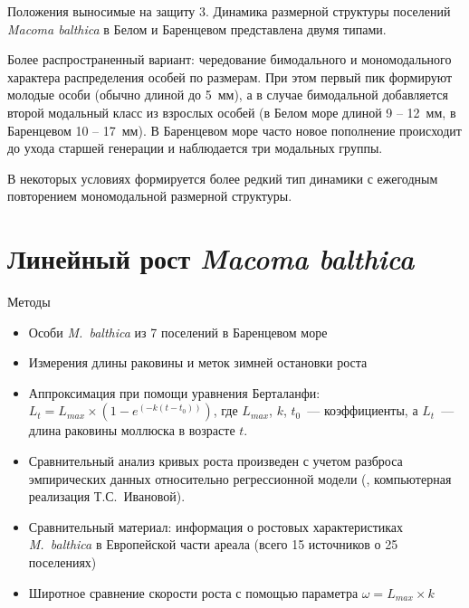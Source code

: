 \documentclass{beamer}
\begin{document}
\begin{frame}{Положения выносимые на защиту}
3. Динамика размерной структуры поселений {\it Macoma balthica} в Белом и Баренцевом представлена двумя типами. 

\smallskip
Более распространенный вариант: чередование бимодального и мономодального характера распределения особей по размерам. 
При этом первый пик формируют молодые особи (обычно длиной до 5~мм), а в случае бимодальной добавляется второй модальный класс из взрослых особей (в Белом море длиной 9 -- 12~мм, в Баренцевом 10 -- 17~мм). 
В Баренцевом море часто новое пополнение происходит до ухода старшей генерации и наблюдается три модальных группы.

\smallskip
В некоторых условиях формируется более редкий тип динамики с ежегодным повторением мономодальной размерной структуры. 
\end{frame}


		\section[Линейный рост]{Линейный рост {\it Macoma balthica}}
\begin{frame}{Методы}
	\begin{itemize}
		\item Особи {\it M.~balthica} из 7 поселений в Баренцевом море
		\item Измерения длины раковины и меток зимней остановки роста
		\item Аппроксимация при помощи уравнения Берталанфи: $L_{t} = L_{max} \times (1 - e^{(-k(t - t_{0}))})$, где $L_{max}$, $k$, $t_{0}$~--- коэффициенты, а $L_{t}$~--- длина раковины моллюска в возрасте $t$.
		\item Сравнительный анализ кривых роста произведен с учетом разброса эмпирических данных относительно регрессионной модели (\cite{Maximovich_1989}, компьютерная реализация Т.\:С.~Ивановой). 
		\item  Сравнительный материал: информация о ростовых характеристиках {\it M.~balthica} в Европейской части ареала (всего 15 источников о 25 поселениях)
		\item Широтное сравнение скорости роста с помощью параметра $\omega = L_{max} \times k$
	\end{itemize}
\end{frame}
\end{document}
